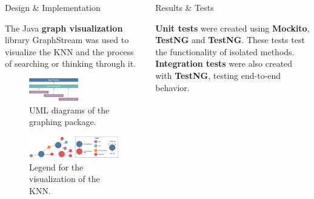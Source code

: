 \documentclass[final]{beamer} %
\newlength{\columnheight}
\begin{document}
\begin{frame}
\begin{columns}
\begin{column}{.33\textwidth}
{\begin{block}{Design \& Implementation}
					\parbox{0.99\textwidth}{
					The Java \textbf{graph visualization} library GraphStream was used to visualize the KNN and the process of searching or thinking through it.}
				
					\begin{figure}
						\centering
						\includegraphics[width=0.55\textwidth]{figures/uml_graphing.pdf}
						\caption{UML diagrams of the graphing package.}
					\end{figure}
					
					\begin{figure}[!htb]
						\centering
						\includegraphics[width=\columnwidth]{figures/knn_graph_legend.pdf}
						\caption
						{Legend for the visualization of the KNN.}
					\end{figure}
					
				\end{block}
				}
			\end{column}
			\begin{column}{.33\textwidth}
				\parbox[t][\columnheight]{\textwidth}{
				\begin{block}{Results \& Tests}
					\parbox{0.99\textwidth}{
						\textbf{Unit tests} were created using \textbf{Mockito}, \textbf{TestNG} and \textbf{TestNG}. These tests test the functionality of isolated methods. \textbf{Integration tests} were also created with \textbf{TestNG}, testing end-to-end behavior.}
					

\end{block}}
\end{column}
\end{columns}
\end{frame}
\end{document}

